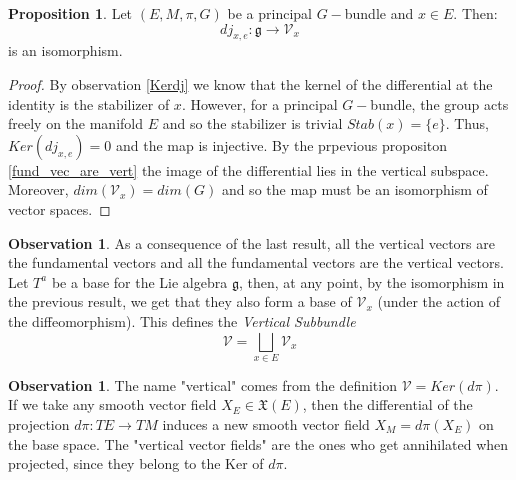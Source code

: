 \documentclass[12pt,a4paper]{report}
\theoremstyle{definition}
\theoremstyle{Theorem}
\newtheorem{Prop}[Def]{Proposition}
\theoremstyle{definition}
\theoremstyle{definition}
\newtheorem{Obs}[Def]{Observation}
\begin{document}
		\begin{Prop}
			Let $(E,M,\pi,G)$ be a principal $G-$bundle and $x\in E$. Then: 
			$$dj_{x,e}:\mathfrak{g}\rightarrow \mathcal{V}_{x}$$ is an isomorphism.
		\end{Prop}
		\begin{proof}
			By observation \ref{Kerdj} we know that the kernel of the differential at the identity is the stabilizer of $x$. However, for a principal $G-$bundle, the group acts freely on the manifold $E$ and so the stabilizer is trivial $Stab(x)=\{e\}$. Thus, $Ker (dj_{x,e})=0$ and the map is injective. By the prpevious propositon \ref{fund_vec_are_vert} the image of the differential lies in the vertical subspace. Moreover, $dim(\mathcal{V}_{x})=dim(G)$ and so the map must be an isomorphism of vector spaces.			
		\end{proof}
		\begin{Obs}
			As a consequence of the last result, all the vertical vectors are the fundamental vectors and all the fundamental vectors are the vertical vectors.\\
			Let $T^a$ be a base for the Lie algebra $\mathfrak{g}$, then, at any point, by the isomorphism in the previous result, we get that they also form a base of $\mathcal{V}_{x}$ (under the action of the diffeomorphism). This defines the \textit{Vertical Subbundle} $$\mathcal{V}=\bigsqcup_{x\in E}\mathcal{V}_{x}$$
		\end{Obs}
		\begin{Obs}
			The name "vertical" comes from the definition $\mathcal{V}=Ker(d\pi)$. If we take any smooth vector field $X_E\in\mathfrak{X}(E)$, then the differential of the projection $d\pi:TE\rightarrow TM$ induces a new smooth vector field $X_M=d\pi (X_E)$ on the base space. The "vertical vector fields" are the ones who get annihilated when projected, since they belong to the Ker of $d\pi$.
		\end{Obs}
\end{document}
